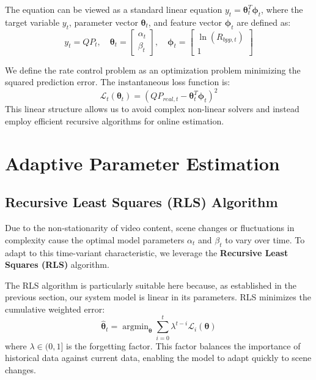The equation can be viewed as a standard linear equation $y_t = \mathbf{\theta}_t^T \mathbf{\phi}_t$, where the target variable $y_t$, parameter vector $\mathbf{\theta}_t$, and feature vector $\mathbf{\phi}_t$ are defined as:
\begin{equation}
    y_t = QP_t, \quad \mathbf{\theta}_t = \begin{bmatrix} \alpha_t \\ \beta_t \end{bmatrix}, \quad \mathbf{\phi}_t = \begin{bmatrix} \ln(R_{bpp, t}) \\ 1 \end{bmatrix}
\end{equation}

We define the rate control problem as an optimization problem minimizing the squared prediction error. The instantaneous loss function is:
\begin{equation}
    \mathcal{L}_t(\mathbf{\theta}_t) = \left( QP_{real, t} - \mathbf{\theta}_t^T \mathbf{\phi}_t \right)^2
\end{equation}
This linear structure allows us to avoid complex non-linear solvers and instead employ efficient recursive algorithms for online estimation.

\section{Adaptive Parameter Estimation}
\label{sec:rls_estimation}

\subsection{Recursive Least Squares (RLS) Algorithm}
Due to the non-stationarity of video content, scene changes or fluctuations in complexity cause the optimal model parameters $\alpha_t$ and $\beta_t$ to vary over time. To adapt to this time-variant characteristic, we leverage the \textbf{Recursive Least Squares (RLS)} algorithm.

The RLS algorithm is particularly suitable here because, as established in the previous section, our system model is linear in its parameters. RLS minimizes the cumulative weighted error:
\begin{equation}
    \hat{\mathbf{\theta}}_t = \mathop{\arg\min}_{\mathbf{\theta}} \sum_{i=0}^{t} \lambda^{t-i} \mathcal{L}_i(\mathbf{\theta})
\end{equation}
where $\lambda \in (0, 1]$ is the forgetting factor. This factor balances the importance of historical data against current data, enabling the model to adapt quickly to scene changes.

